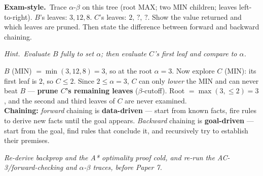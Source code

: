 \documentclass[11pt,a4paper]{article}
\newcommand{\hint}[1]{\par{\small\textcolor{accent}{\textit{Hint.}}\ \textit{#1}}\par\smallskip}
\newcommand{\exam}{\smallskip\textbf{\textcolor{warn}{Exam-style.}}\ }
\begin{document}
\exam Trace $\alpha$-$\beta$ on this tree (root MAX; two MIN children; leaves left-to-right). $B$'s leaves: $3,12,8$. $C$'s leaves: $2,\,?,\,?$. Show the value returned and which leaves are pruned. Then state the difference between forward and backward chaining.
\hint{Evaluate $B$ fully to set $\alpha$; then evaluate $C$'s first leaf and compare to $\alpha$.}
\begin{sol}
$B$ (MIN) $=\min(3,12,8)=3$, so at the root $\alpha=3$. Now explore $C$ (MIN): its first leaf is $2$, so $C\le 2$. Since $2\le\alpha=3$, $C$ can only \emph{lower} the MIN and can never beat $B$ --- \textbf{prune $C$'s remaining leaves} ($\beta$-cutoff). Root $=\max(3,\le 2)=\boxed{3}$, and the second and third leaves of $C$ are never examined.\\[3pt]
\textbf{Chaining:} \emph{forward} chaining is \textbf{data-driven} --- start from known facts, fire rules to derive new facts until the goal appears. \emph{Backward} chaining is \textbf{goal-driven} --- start from the goal, find rules that conclude it, and recursively try to establish their premises.
\end{sol}

\vspace{0.3cm}
\begin{center}\textit{Re-derive backprop and the A* optimality proof cold, and re-run the AC-3/forward-checking and $\alpha$-$\beta$ traces, before Paper 7.}\end{center}
\end{document}
